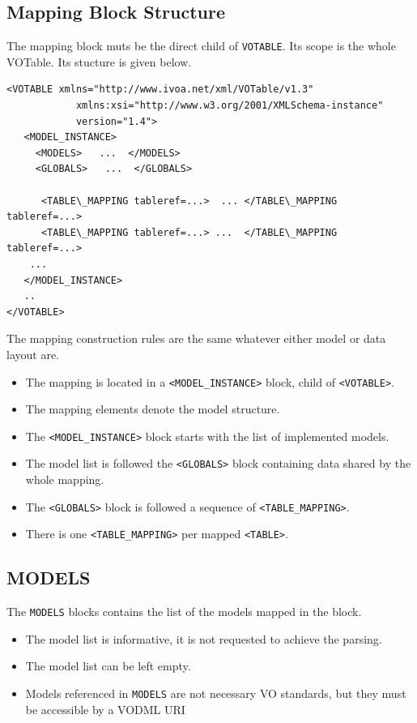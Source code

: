 \documentclass[11pt,a4paper]{ivoa}
\begin{document}
\subsection{Mapping Block Structure}

The mapping block muts be the direct child of \texttt{VOTABLE}. Its scope is the whole VOTable. Its stucture is given below.

\begin{lstlisting}[caption={INSTANCE bloc example},style=XML]
<VOTABLE xmlns="http://www.ivoa.net/xml/VOTable/v1.3" 
            xmlns:xsi="http://www.w3.org/2001/XMLSchema-instance" 
            version="1.4">
   <MODEL_INSTANCE>
     <MODELS>   ...  </MODELS>
     <GLOBALS>   ...  </GLOBALS>

      <TABLE\_MAPPING tableref=...>  ... </TABLE\_MAPPING tableref=...>
      <TABLE\_MAPPING tableref=...> ...  </TABLE\_MAPPING tableref=...>
    ...
   </MODEL_INSTANCE>
   ..
</VOTABLE>
\end{lstlisting}

The mapping construction rules are the same whatever either model or data layout are.

\begin{itemize}
    \item The mapping is located in a \texttt{<MODEL\_INSTANCE>} block, child of \texttt{<VOTABLE>}.
    \item The mapping elements denote the model structure.
    \item The \texttt{<MODEL\_INSTANCE>} block starts with the list of implemented models.
    \item The model list is followed the \texttt{<GLOBALS>} block containing data shared by the whole mapping.    
    \item The \texttt{<GLOBALS>} block is followed a sequence of \texttt{<TABLE\_MAPPING>}.
    \item There is one \texttt{<TABLE\_MAPPING>} per mapped \texttt{<TABLE>}.
\end{itemize}

%
%

\subsection{MODELS}

The  \texttt{MODELS}  blocks contains the list of the models mapped in the block. 


\begin{itemize}
    \item The model list is informative, it is not requested to achieve the parsing.
    \item The model list can be left empty.
    \item Models referenced in \texttt{MODELS} are not necessary VO standards, but they must be accessible by a VODML URI
\end{itemize}
\end{document}
